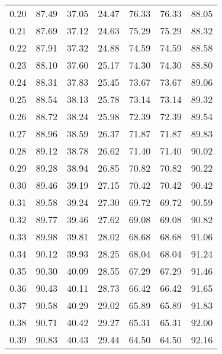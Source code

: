 \begin{tabular}{|c|c|c|c|c|c|c|}
      0.20 &     87.49 &     37.05 &      24.47 &   76.33 &      76.33 &         88.05 \\
      0.21 &     87.69 &     37.12 &      24.63 &   75.29 &      75.29 &         88.32 \\
      0.22 &     87.91 &     37.32 &      24.88 &   74.59 &      74.59 &         88.58 \\
      0.23 &     88.10 &     37.60 &      25.17 &   74.30 &      74.30 &         88.80 \\
      0.24 &     88.31 &     37.83 &      25.45 &   73.67 &      73.67 &         89.06 \\
      0.25 &     88.54 &     38.13 &      25.78 &   73.14 &      73.14 &         89.32 \\
      0.26 &     88.72 &     38.24 &      25.98 &   72.39 &      72.39 &         89.54 \\
      0.27 &     88.96 &     38.59 &      26.37 &   71.87 &      71.87 &         89.83 \\
      0.28 &     89.12 &     38.78 &      26.62 &   71.40 &      71.40 &         90.02 \\
      0.29 &     89.28 &     38.94 &      26.85 &   70.82 &      70.82 &         90.22 \\
      0.30 &     89.46 &     39.19 &      27.15 &   70.42 &      70.42 &         90.42 \\
      0.31 &     89.58 &     39.24 &      27.30 &   69.72 &      69.72 &         90.59 \\
      0.32 &     89.77 &     39.46 &      27.62 &   69.08 &      69.08 &         90.82 \\
      0.33 &     89.98 &     39.81 &      28.02 &   68.68 &      68.68 &         91.06 \\
      0.34 &     90.12 &     39.93 &      28.25 &   68.04 &      68.04 &         91.24 \\
      0.35 &     90.30 &     40.09 &      28.55 &   67.29 &      67.29 &         91.46 \\
      0.36 &     90.43 &     40.11 &      28.73 &   66.42 &      66.42 &         91.65 \\
      0.37 &     90.58 &     40.29 &      29.02 &   65.89 &      65.89 &         91.83 \\
      0.38 &     90.71 &     40.42 &      29.27 &   65.31 &      65.31 &         92.00 \\
      0.39 &     90.83 &     40.43 &      29.44 &   64.50 &      64.50 &         92.16 \\

\end{tabular}
